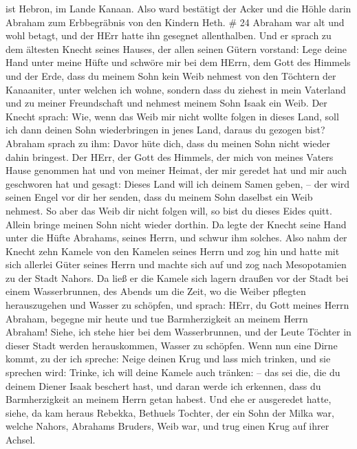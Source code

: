 ist Hebron, im Lande Kanaan.  Also ward bestätigt der Acker
und die Höhle darin Abraham zum Erbbegräbnis von den Kindern Heth. \# 24
 Abraham war alt und wohl betagt, und der HErr hatte ihn
gesegnet allenthalben.  Und er sprach zu dem ältesten Knecht
seines Hauses, der allen seinen Gütern vorstand: Lege deine Hand unter
meine Hüfte  und schwöre mir bei dem HErrn, dem Gott des
Himmels und der Erde, dass du meinem Sohn kein Weib nehmest von den
Töchtern der Kanaaniter, unter welchen ich wohne,  sondern
dass du ziehest in mein Vaterland und zu meiner Freundschaft und nehmest
meinem Sohn Isaak ein Weib.  Der Knecht sprach: Wie, wenn
das Weib mir nicht wollte folgen in dieses Land, soll ich dann deinen
Sohn wiederbringen in jenes Land, daraus du gezogen bist? 
Abraham sprach zu ihm: Davor hüte dich, dass du meinen Sohn nicht wieder
dahin bringest.  Der HErr, der Gott des Himmels, der mich
von meines Vaters Hause genommen hat und von meiner Heimat, der mir
geredet hat und mir auch geschworen hat und gesagt: Dieses Land will ich
deinem Samen geben, -- der wird seinen Engel vor dir her senden, dass du
meinem Sohn daselbst ein Weib nehmest.  So aber das Weib dir
nicht folgen will, so bist du dieses Eides quitt. Allein bringe meinen
Sohn nicht wieder dorthin.  Da legte der Knecht seine Hand
unter die Hüfte Abrahams, seines Herrn, und schwur ihm solches.
 Also nahm der Knecht zehn Kamele von den Kamelen seines
Herrn und zog hin und hatte mit sich allerlei Güter seines Herrn und
machte sich auf und zog nach Mesopotamien zu der Stadt Nahors.
 Da ließ er die Kamele sich lagern draußen vor der Stadt
bei einem Wasserbrunnen, des Abends um die Zeit, wo die Weiber pflegten
herauszugehen und Wasser zu schöpfen,  und sprach: HErr, du
Gott meines Herrn Abraham, begegne mir heute und tue Barmherzigkeit an
meinem Herrn Abraham!  Siehe, ich stehe hier bei dem
Wasserbrunnen, und der Leute Töchter in dieser Stadt werden
herauskommen, Wasser zu schöpfen.  Wenn nun eine Dirne
kommt, zu der ich spreche: Neige deinen Krug und lass mich trinken, und
sie sprechen wird: Trinke, ich will deine Kamele auch tränken: -- das
sei die, die du deinem Diener Isaak beschert hast, und daran werde ich
erkennen, dass du Barmherzigkeit an meinem Herrn getan habest.
 Und ehe er ausgeredet hatte, siehe, da kam heraus Rebekka,
Bethuels Tochter, der ein Sohn der Milka war, welche Nahors, Abrahams
Bruders, Weib war, und trug einen Krug auf ihrer Achsel. 
